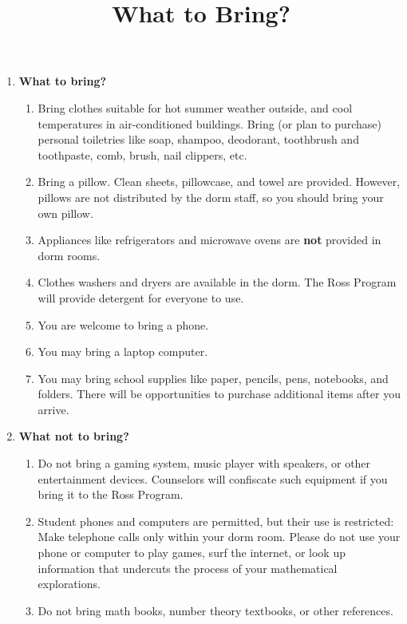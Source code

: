 \documentclass[11pt]{ross}
\title{What to Bring?}
\begin{document}
\maketitle
 \begin{enumerate}[label=(\arabic*),itemsep=2em,topsep=-1em]

\item \textbf{What to bring?}
 \begin{enumerate}[label=(\alph*),itemsep=0.5em,topsep=0em]
 \item Bring clothes suitable for hot summer weather outside, and cool
   temperatures in air-conditioned buildings.  Bring (or plan to
   purchase) personal toiletries like soap, shampoo, deodorant,
   toothbrush and toothpaste, comb, brush, nail clippers, etc.
 \item Bring a pillow.  Clean sheets, pillowcase, and towel are
   provided.  However, pillows are not distributed by the dorm
   staff, so you should bring your own pillow.
 \item Appliances like refrigerators and microwave ovens are \textbf{not} provided in dorm rooms.
 \item Clothes washers and dryers are available in the dorm.  The Ross
    Program will provide detergent for everyone to use.
  \item You are welcome to bring a phone.
  \item You may bring a laptop computer.
 \item  You may bring school supplies like paper, 
   pencils, pens, notebooks, and folders. There will be opportunities 
   to purchase additional items after you arrive.
\end{enumerate}
\item \textbf{What not to bring?}
  \begin{enumerate}[label=(\alph*),itemsep=0.5em,topsep=0em]
  \item Do not bring a gaming system, music player with speakers, 
    or other entertainment devices.  
    Counselors will confiscate such equipment if you bring it to the
    Ross Program.
  \item Student phones and computers are permitted, but their use is
    restricted: Make telephone calls only within your dorm room.
    Please do not use your phone or computer to play games, surf the internet, or
    look up information that undercuts the process of your
    mathematical explorations.
  \item Do not bring math books, number theory textbooks, or other references.  

\end{enumerate}
\end{enumerate}
\end{document}
